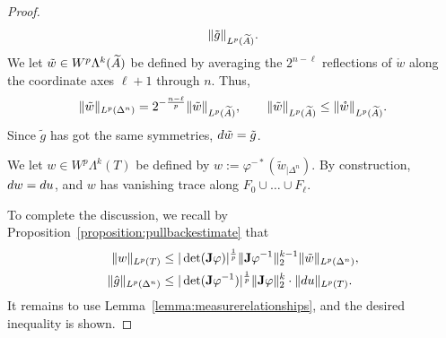 \documentclass[10pt,a4paper]{article}
\begin{document}
\begin{proof}
\begin{align*}
        \| \tilde g \|_{L^{p}(\widetilde {A})}
        .
    \end{align*}
    We let $\tilde w \in W^{p}\Lambda^{k}(\widetilde {A})$ be defined by averaging the $2^{n - \ell}$ reflections of $\mathring w$ along the coordinate axes $\ell+1$ through $n$. Thus,
    \begin{align*}
        \| \tilde w \|_{L^{p}(\Delta^{n})}
        =
        2^{-\frac{n-\ell}{p}}
        \| \tilde w \|_{L^{p}(\widetilde {A})}
        ,
        \qquad 
        \| \tilde w \|_{L^{p}(\widetilde {A})}
        \leq 
        \| \mathring w \|_{L^{p}(\widetilde {A})}
        .
    \end{align*}
    Since $\tilde g$ has got the same symmetries, $d \tilde w = \tilde g$.
    \color{red}
    \color{blue}
    \color{black}
    
    We let $w \in W^{p}\Lambda^{k}(T)$ be defined by $w := \varphi^{-\ast} ( \tilde w_{|\Delta^n} )$.
    By construction, $d w = d u$,
    and $w$ has vanishing trace along $F_{0} \cup \dots \cup F_{\ell}$.
    
    To complete the discussion, we recall by Proposition~\ref{proposition:pullbackestimate} that 
    \begin{align*}
        \| w \|_{L^{p}(T)}
        &\leq 
        |\det({\mathbf{J}} \varphi)|^{\frac 1 p} 
        \|  {\mathbf{J}} \varphi^{-1}  \|_{2}^{k-1}
        \| \tilde w \|_{L^{p}(\Delta^n)}
        ,
        \\
        \| \hat g \|_{L^{p}(\Delta^n)}
        &\leq 
        |\det( {\mathbf{J}} \varphi^{-1} )|^{\frac 1 p} 
        \| {\mathbf{J}} \varphi \|_{2}^{k}
        \cdot 
        \| d u \|_{L^{p}(T)}
        .
    \end{align*}
    It remains to use Lemma~\ref{lemma:measurerelationships}, and the desired inequality is shown. 
\end{proof}
\end{document}
